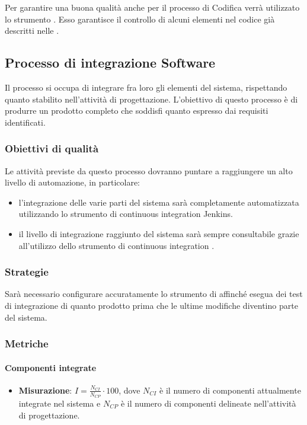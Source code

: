 Per garantire una buona qualità anche per il processo di Codifica verrà utilizzato lo strumento . Esso garantisce il controllo di alcuni elementi nel codice già descritti nelle \NdP.



\subsection{Processo di integrazione Software}
Il processo si occupa di integrare fra loro gli elementi del sistema, rispettando quanto stabilito nell'attività di progettazione. L'obiettivo di questo processo è di produrre un prodotto completo che soddisfi quanto espresso dai requisiti identificati.

\subsubsection{Obiettivi di qualità}
Le attività previste da questo processo dovranno puntare a raggiungere un alto livello di automazione, in particolare:
\begin{itemize}
\item l'integrazione delle varie parti del sistema sarà completamente automatizzata utilizzando lo strumento di continuous integration Jenkins.
\item il livello di integrazione raggiunto del sistema sarà sempre consultabile grazie all'utilizzo dello strumento di continuous integration .
\end{itemize}

\subsubsection{Strategie}
Sarà necessario configurare accuratamente lo strumento di   affinché esegua dei test di integrazione di quanto prodotto prima che le ultime modifiche diventino parte del sistema.

\subsubsection{Metriche}
\paragraph{Componenti integrate}

\begin{itemize}
\item \textbf{Misurazione}: $I=\frac{N_{CI}}{N_{CP}} \cdot 100$, dove $N_{CI}$ è il numero di componenti attualmente integrate nel sistema e $N_{CP}$ è il numero di componenti delineate nell'attività di progettazione.
\end{itemize}

